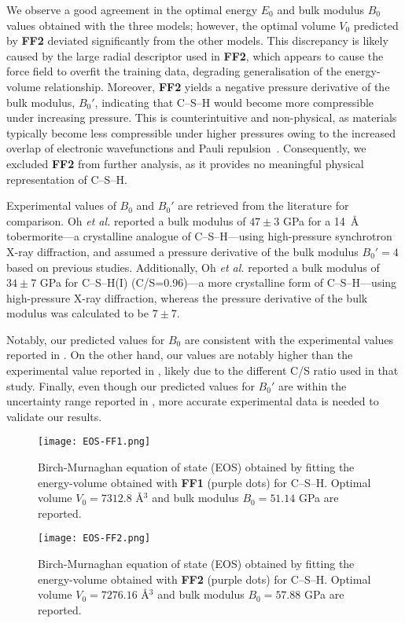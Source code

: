We observe a good agreement in the optimal energy $E_0$ and bulk modulus $B_0$ values obtained with the three models; however, the optimal volume $V_0$ predicted by \textbf{FF2} deviated significantly from the other models. This discrepancy is likely caused by the large radial descriptor used in \textbf{FF2}, which appears to cause the force field to overfit the training data, degrading generalisation of the energy-volume relationship. Moreover, \textbf{FF2} yields a negative pressure derivative of the bulk modulus, $B_0'$, indicating that C--S--H would become more compressible under increasing pressure. This is counterintuitive and non-physical, as materials typically become less compressible under higher pressures owing to the increased overlap of electronic wavefunctions and Pauli repulsion~\cite{gilman2003electronic}. Consequently, we excluded \textbf{FF2} from further analysis, as it provides no meaningful physical representation of C--S--H.

Experimental values of $B_0$ and $B_0'$ are retrieved from the literature for comparison. Oh \emph{et al.} \cite{Oh2012} reported a bulk modulus of $47\pm3$ GPa for a 14~\AA{} tobermorite---a crystalline analogue of C--S--H---using high-pressure synchrotron X-ray diffraction, and assumed a pressure derivative of the bulk modulus $B_0'=4$ based on previous studies. Additionally, Oh \emph{et al.} \cite{Oh2011} reported a bulk modulus of $34\pm7$ GPa for C--S--H(I) (C/S=0.96)---a more crystalline form of C--S--H---using high-pressure X-ray diffraction, whereas the pressure derivative of the bulk modulus was calculated to be $7\pm7$.

Notably, our predicted values for $B_0$ are consistent with the experimental values reported in \cite{Oh2012}. On the other hand, our values are notably higher than the experimental value reported in \cite{Oh2011}, likely due to the different C/S ratio used in that study. Finally, even though our predicted values for $B_0'$ are within the uncertainty range reported in \cite{Oh2011}, more accurate experimental data is needed to validate our results.

\begin{figure}[h!]
    \centering
    \texttt{[image: EOS-FF1.png]}
    \caption{
    Birch-Murnaghan equation of state (EOS) obtained by fitting the energy-volume obtained with \textbf{FF1} (purple dots) for C--S--H. Optimal volume $V_0=7312.8$ \AA$^3$ and bulk modulus $B_0=51.14$ GPa are reported.
    }
    \label{fig:eos-ff1}
\end{figure}
\begin{figure}[H]
    \centering
    \texttt{[image: EOS-FF2.png]}
    \caption{
    Birch-Murnaghan equation of state (EOS) obtained by fitting the energy-volume obtained with \textbf{FF2} (purple dots) for C--S--H. Optimal volume $V_0=7276.16$ \AA$^3$ and bulk modulus $B_0=57.88$ GPa are reported.}
    \label{fig:eos-ff2}
\end{figure}

